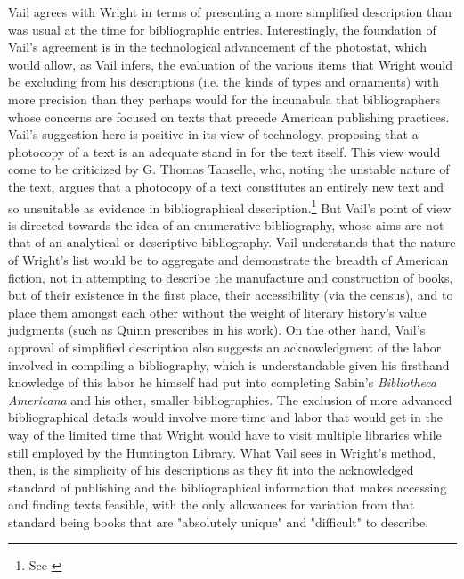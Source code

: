 Vail agrees with Wright in terms of presenting a more simplified description than was usual at the time for bibliographic entries. Interestingly, the foundation of Vail's agreement is in the technological advancement of the photostat, which would allow, as Vail infers, the evaluation of the various items that Wright would be excluding from his descriptions (i.e. the kinds of types and ornaments) with more precision than they perhaps would for the incunabula that bibliographers whose concerns are focused on texts that precede American publishing practices. Vail's suggestion here is positive in its view of technology, proposing that a photocopy of a text is an adequate stand in for the text itself. This view would come to be criticized by G. Thomas Tanselle, who, noting the unstable nature of the text, argues that a photocopy of a text constitutes an entirely new text and so unsuitable as evidence in bibliographical description.\footnote{See \autocite{tanselle_reproductions_1989}} But Vail's point of view is directed towards the idea of an enumerative bibliography, whose aims are not that of an analytical or descriptive bibliography. Vail understands that the nature of Wright's list would be to aggregate and demonstrate the breadth of American fiction, not in attempting to describe the manufacture and construction of books, but of their existence in the first place, their accessibility (via the census), and to place them amongst each other without the weight of literary history's value judgments (such as Quinn prescribes in his work). On the other hand, Vail's approval of simplified description also suggests an acknowledgment of the labor involved in compiling a bibliography, which is understandable given his firsthand knowledge of this labor he himself had put into completing Sabin's \textit{Bibliotheca Americana} and his other, smaller bibliographies. The exclusion of more advanced bibliographical details would involve more time and labor that would get in the way of the limited time that Wright would have to visit multiple libraries while still employed by the Huntington Library. What Vail sees in Wright's method, then, is the simplicity of his descriptions as they fit into the acknowledged standard of publishing and the bibliographical information that makes accessing and finding texts feasible, with the only allowances for variation from that standard being books that are "absolutely unique" and "difficult" to describe.

